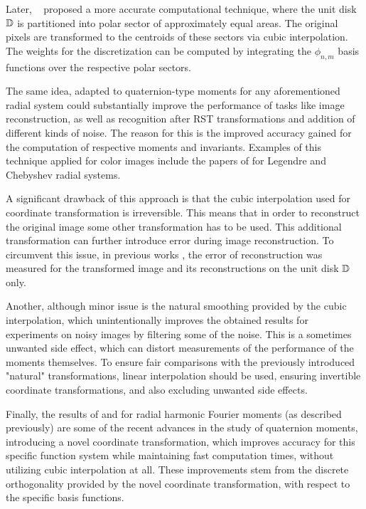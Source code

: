 Later, \citeauthor{Xin}~\cite{Xin} proposed a more accurate computational technique, where the unit disk $\mathbb{D}$ is partitioned into polar sector of approximately equal areas. The original pixels are transformed to the centroids of these sectors via cubic interpolation. The weights for the discretization can be computed by integrating the $\phi_{n,m}$ basis functions over the respective polar sectors.


The same idea, adapted to quaternion-type moments for any aforementioned radial system could substantially improve the performance of tasks like image reconstruction, as well as recognition after RST transformations and addition of different kinds of noise. The reason for this is the improved accuracy gained for the computation of respective moments and invariants. Examples of this technique applied for color images include the papers of \citeauthor{HosnyLegendre} for Legendre \cite{HosnyLegendre} and Chebyshev \cite{HosnyChebyshev} radial systems.


A significant drawback of this approach is that the cubic interpolation used for coordinate transformation is irreversible. This means that in order to reconstruct the original image some other transformation has to be used. This additional transformation can further introduce error during image reconstruction. 
To circumvent this issue, in previous works \cite{LiaoPawlak,PawlakLiao,Xin,HosnyLegendre,HosnyChebyshev}, the error of reconstruction was measured for the transformed image and its reconstructions on the unit disk $\mathbb{D}$ only. 


Another, although minor issue is the natural smoothing provided by the cubic interpolation, which unintentionally improves the obtained results for experiments on noisy images by filtering some of the noise. This is a sometimes unwanted side effect, which can distort measurements of the performance of the moments themselves. To ensure fair comparisons with the previously introduced "natural" transformations, linear interpolation should be used, ensuring invertible coordinate transformations, and also excluding unwanted side effects.


Finally, the results of \citeauthor{WangAcc} \cite{WangAcc} and \citeauthor{LiuAcc} \cite{LiuAcc} for radial harmonic Fourier moments (as described previously) are some of the recent advances in the study of quaternion moments, introducing a novel coordinate transformation, which improves accuracy for this specific function system while maintaining fast computation times, without utilizing cubic interpolation at all. These improvements stem from the discrete orthogonality provided by the novel coordinate transformation, with respect to the specific basis functions.

